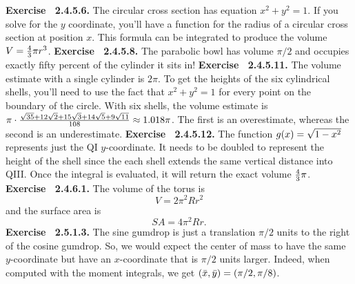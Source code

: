  {\noindent \protect \bf  Exercise ~2.4.5.6.} The circular cross section has equation $x^2+y^2=1$. If you solve for the $y$ coordinate, you'll have a function for the radius of a circular cross section at position $x$. This formula can be integrated to produce the volume $V=\protect \frac  {4}{3}\pi r^3$. \protect \newline  \protect \newline  
 {\noindent \protect \bf  Exercise ~2.4.5.8.} The parabolic bowl has volume $\pi /2$ and occupies exactly fifty percent of the cylinder it sits in! \protect \newline  \protect \newline  
 {\noindent \protect \bf  Exercise ~2.4.5.11.} The volume estimate with a single cylinder is $2\pi $. To get the heights of the six cylindrical shells, you'll need to use the fact that $x^2+y^2=1$ for every point on the boundary of the circle. With six shells, the volume estimate is $\pi \cdot \protect \frac  {\protect \sqrt  {35} + 12 \protect \sqrt  {2} + 15 \protect \sqrt  {3} + 14 \protect \sqrt  {5} + 9 \protect \sqrt  {11}}{108}\approx 1.018\pi $. The first is an overestimate, whereas the second is an underestimate. \protect \newline  \protect \newline  
 {\noindent \protect \bf  Exercise ~2.4.5.12.} The function $g(x)=\protect \sqrt  {1-x^2}$ represents just the QI $y$-coordinate. It needs to be doubled to represent the height of the shell since the each shell extends the same vertical distance into QIII. Once the integral is evaluated, it will return the exact volume $\protect \frac  {4}{3}\pi $. \protect \newline  \protect \newline  
 {\noindent \protect \bf  Exercise ~2.4.6.1.} The volume of the torus is $$V=2\pi ^2Rr^2 $$ and the surface area is $$SA=4\pi ^2Rr. $$ \protect \newline  \protect \newline  
 {\noindent \protect \bf  Exercise ~2.5.1.3.} The sine gumdrop is just a translation $\pi /2$ units to the right of the cosine gumdrop. So, we would expect the center of mass to have the same $y$-coordinate but have an $x$-coordinate that is $\pi /2$ units larger. Indeed, when computed with the moment integrals, we get $\left (\protect \mathaccentV {bar}016{x},\protect \mathaccentV {bar}016{y}\right )=\left (\pi /2,\pi /8\right )$.  \protect \newline  \protect \newline  
